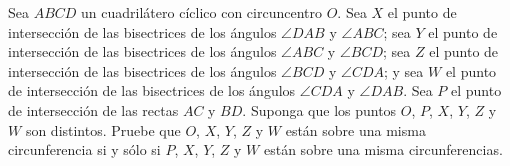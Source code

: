 Sea $ABCD$ un cuadrilátero cíclico con circuncentro $O$. Sea $X$ el punto de intersección de las bisectrices de los ángulos $\angle DAB$ y $\angle ABC$; sea $Y$ el punto de intersección de las bisectrices de los ángulos $\angle ABC$ y $\angle BCD$; sea $Z$ el punto de intersección de las bisectrices de los ángulos $\angle BCD$ y $\angle CDA$; y sea $W$ el punto de intersección de las bisectrices de los ángulos $\angle CDA$ y $\angle DAB$. Sea $P$ el punto de intersección de las rectas $AC$ y $BD$. Suponga que los puntos $O$, $P$, $X$, $Y$, $Z$ y $W$ son distintos.
 \newline 
Pruebe que $O$, $X$, $Y$, $Z$ y $W$ están sobre una misma circunferencia si y sólo si $P$, $X$, $Y$, $Z$ y $W$ están sobre una misma circunferencias.